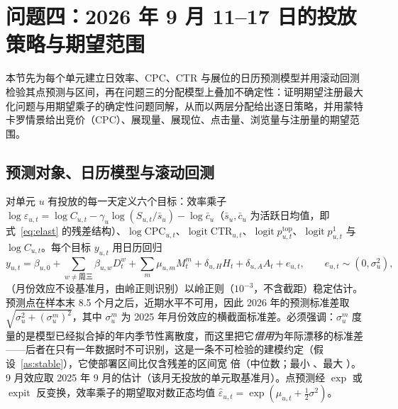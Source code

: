 \section{问题四：2026 年 9 月 11--17 日的投放策略与期望范围}
\label{sec:q4}
本节先为每个单元建立日效率、CPC、CTR 与展位的日历预测模型并用滚动回测检验其点预测与区间，再在问题三的分配模型上叠加不确定性：证明期望注册最大化问题与用期望乘子的确定性问题同解，从而以两层分配给出逐日策略，并用蒙特卡罗情景给出竞价（CPC）、展现量、展现位、点击量、浏览量与注册量的期望范围。

\subsection{预测对象、日历模型与滚动回测}
\label{sec:q4model}
对单元 $u$ 有投放的每一天定义六个目标：效率乘子 $\log\varepsilon_{u,t}=\log C_{u,t}-\gamma_u\log(S_{u,t}/\bar s_u)-\log\bar c_u$（$\bar s_u,\bar c_u$ 为活跃日均值，即式~\eqref{eq:elast} 的残差结构）、$\log\mathrm{CPC}_{u,t}$、$\operatorname{logit}\mathrm{CTR}_{u,t}$、$\operatorname{logit}p^{\mathrm{top}}_{u,t}$、$\operatorname{logit}p^{1}_{u,t}$ 与 $\log C_{u,t}$。每个目标 $y_{u,t}$ 用日历回归
\begin{equation}\label{eq:fcmodel}
y_{u,t}=\beta_{u,0}+\sum_{w\ne\text{周三}}\beta_{u,w}D^{w}_t+\sum_{m}\mu_{u,m}M^{m}_t+\delta_{u,H}H_t+\delta_{u,A}A_t+e_{u,t},\qquad e_{u,t}\sim(0,\sigma_u^2),
\end{equation}
（月份效应不设基准月，由岭正则识别）以岭正则（$10^{-3}$，不含截距）稳定估计。预测点在样本末 8.5 个月之后，近期水平不可用，因此 2026 年的预测标准差取 $\sqrt{\sigma_u^2+(\sigma^{m}_u)^2}$，其中 $\sigma^{m}_u$ 为 2025 年月份效应的横截面标准差。必须强调：$\sigma^{m}_u$ 度量的是模型已经拟合掉的年内季节性离散度，而这里把它\emph{借用}为年际漂移的标准差——后者在只有一年数据时不可识别，这是一条不可检验的建模约定（假设~\ref{as:stable}），它使部署区间比仅含残差的区间宽 \valQfourWidthInflationMedian{} 倍（中位数；最小 \valQfourWidthInflationMin、最大 \valQfourWidthInflationMax）。9 月效应取 2025 年 9 月的估计（该月无投放的单元取基准月）。点预测经 $\exp$ 或 $\operatorname{expit}$ 反变换，效率乘子的期望取对数正态均值 $\hat\varepsilon_{u,t}=\exp(\mu_{u,t}+\tfrac12\sigma^2)$。

